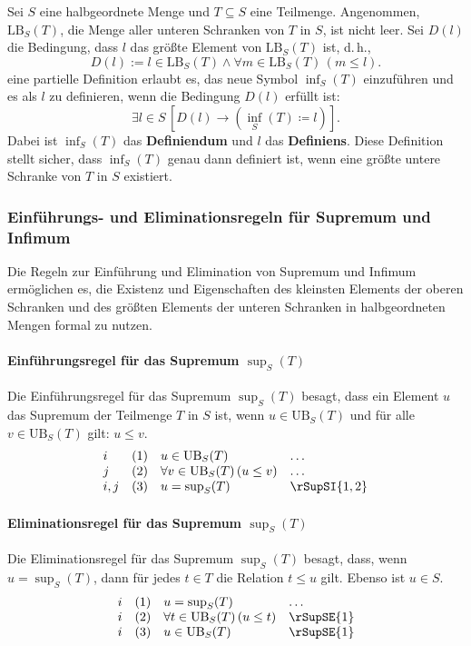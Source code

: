 \documentclass[main.tex]{subfiles}
\begin{document}
\begin{definition}[Infimum]
    Sei \( S \) eine halbgeordnete Menge und \( T \subseteq S \) eine Teilmenge. Angenommen, \(\text{LB}_S(T)\), die Menge aller unteren Schranken von \( T \) in \( S \), ist nicht leer. Sei \( D(l) \) die Bedingung, dass \( l \) das größte Element von \(\text{LB}_S(T)\) ist, d.\,h.,
    \[
    D(l) := l \in \text{LB}_S(T) \land \forall m \in \text{LB}_S(T) \, (m \leq l).
    \]
    eine partielle Definition erlaubt es, das neue Symbol \(\inf_S(T)\) einzuführen und es als \( l \) zu definieren, wenn die Bedingung \( D(l) \) erfüllt ist:
    \[
    \exists l \in S \, [ D(l) \rightarrow (\inf_S(T) \coloneqq l) ].
    \]
    Dabei ist \(\inf_S(T)\) das \textbf{Definiendum} und \( l \) das \textbf{Definiens}. Diese Definition stellt sicher, dass \(\inf_S(T)\) genau dann definiert ist, wenn eine größte untere Schranke von \( T \) in \( S \) existiert.
\end{definition}

\subsubsection{Einführungs- und Eliminationsregeln für Supremum und Infimum}
\label{rule:rSupSI} \label{rule:rSupSE} \label{rule:rInfSI} \label{rule:rInfSE}

Die Regeln zur Einführung und Elimination von Supremum und Infimum ermöglichen es, die Existenz und Eigenschaften des kleinsten Elements der oberen Schranken und des größten Elements der unteren Schranken in halbgeordneten Mengen formal zu nutzen.

\paragraph{Einführungsregel für das Supremum \(\sup_S(T)\)}
Die Einführungsregel für das Supremum \(\sup_S(T)\) besagt, dass ein Element \( u \) das Supremum der Teilmenge \( T \) in \( S \) ist, wenn \( u \in \text{UB}_S(T) \) und für alle \( v \in \text{UB}_S(T) \) gilt: \( u \leq v \).
\[
\begin{array}{llll}
    i   & (1) & u \in \text{UB}_S(T) & \dots \\
    j   & (2) & \forall v \in \text{UB}_S(T) \, (u \leq v) & \dots \\
    i,j & (3) & u = \sup_S(T) & \rSupSI{1,2}
\end{array}
\]

\paragraph{Eliminationsregel für das Supremum \(\sup_S(T)\)}
Die Eliminationsregel für das Supremum \(\sup_S(T)\) besagt, dass, wenn \( u = \sup_S(T) \), dann für jedes \( t \in T \) die Relation \( t \leq u \) gilt. Ebenso ist \( u \in S \).
\[
\begin{array}{llll}
    i & (1) & u = \sup_S(T) & \dots \\
    i & (2) & \forall t \in \text{UB}_S(T) \, (u \leq t) & \rSupSE{1} \\
    i & (3) & u \in \text{UB}_S(T) & \rSupSE{1}
\end{array}
\]
\end{document}
